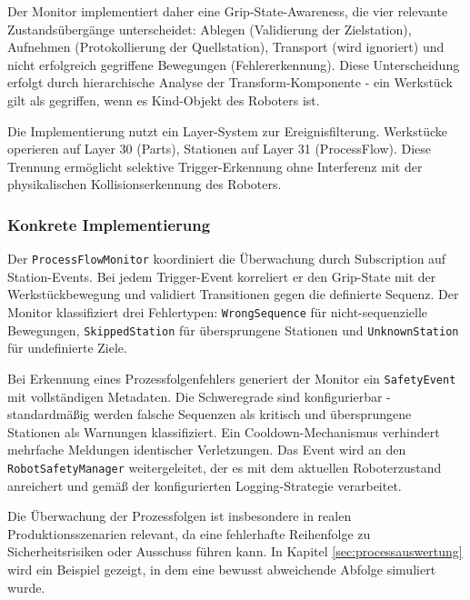 Der Monitor implementiert daher eine Grip-State-Awareness, die vier
relevante Zustandsübergänge unterscheidet: Ablegen (Validierung der
Zielstation),
Aufnehmen (Protokollierung der Quellstation), Transport (wird ignoriert) und
nicht erfolgreich gegriffene Bewegungen (Fehlererkennung). Diese
Unterscheidung erfolgt durch
hierarchische Analyse der Transform-Komponente - ein Werkstück gilt als
gegriffen, wenn es Kind-Objekt des Roboters ist.

Die Implementierung nutzt ein Layer-System zur Ereignisfilterung. Werkstücke
operieren auf Layer 30 (Parts), Stationen auf Layer 31 (ProcessFlow). Diese
Trennung ermöglicht selektive Trigger-Erkennung ohne Interferenz mit der
physikalischen Kollisionserkennung des Roboters.

\subsubsection{Konkrete Implementierung}
Der \texttt{ProcessFlowMonitor} koordiniert die Überwachung durch Subscription
auf Station-Events. Bei jedem Trigger-Event korreliert er den Grip-State mit
der Werkstückbewegung und validiert Transitionen gegen die definierte Sequenz.
Der Monitor klassifiziert drei Fehlertypen: \texttt{WrongSequence} für
nicht-sequenzielle Bewegungen, \texttt{SkippedStation} für übersprungene
Stationen und \texttt{UnknownStation} für undefinierte Ziele.

Bei Erkennung eines Prozessfolgenfehlers generiert der Monitor ein
\texttt{SafetyEvent} mit
vollständigen Metadaten. Die Schweregrade sind konfigurierbar - standardmäßig
werden falsche Sequenzen als kritisch und übersprungene Stationen als Warnungen
klassifiziert. Ein Cooldown-Mechanismus verhindert mehrfache Meldungen
identischer Verletzungen. Das Event wird an den \texttt{RobotSafetyManager}
weitergeleitet, der es mit dem aktuellen Roboterzustand anreichert und gemäß
der konfigurierten Logging-Strategie verarbeitet.

Die Überwachung der Prozessfolgen ist insbesondere in realen
Produktionsszenarien relevant, da eine fehlerhafte Reihenfolge
zu Sicherheitsrisiken oder Ausschuss führen kann.
In Kapitel \ref{sec:processauswertung} wird ein Beispiel gezeigt, in
dem eine bewusst abweichende Abfolge simuliert wurde.
